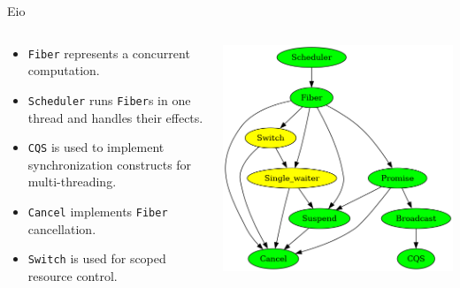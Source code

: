 \documentclass[aspectratio=43]{beamer}
\newcommand{\ocaml}[1]{\texttt{#1}}
\begin{document}
\begin{frame}{Eio}
    \begin{columns}
        \begin{column}{0.5\textwidth}
            \begin{itemize}
                \item \ocaml{Fiber} represents a concurrent computation.
                \item \ocaml{Scheduler} runs \ocaml{Fiber}s in one thread and handles their effects.
                \item \ocaml{CQS} is used to implement synchronization constructs for multi-threading.
                \item \ocaml{Cancel} implements \ocaml{Fiber} cancellation.
                \item \ocaml{Switch} is used for scoped resource control.
            \end{itemize}
        \end{column}
        \begin{column}{0.5\textwidth}
            \includegraphics[width=\textwidth]{codept}
        \end{column}
    \end{columns}
\end{frame}
\end{document}
